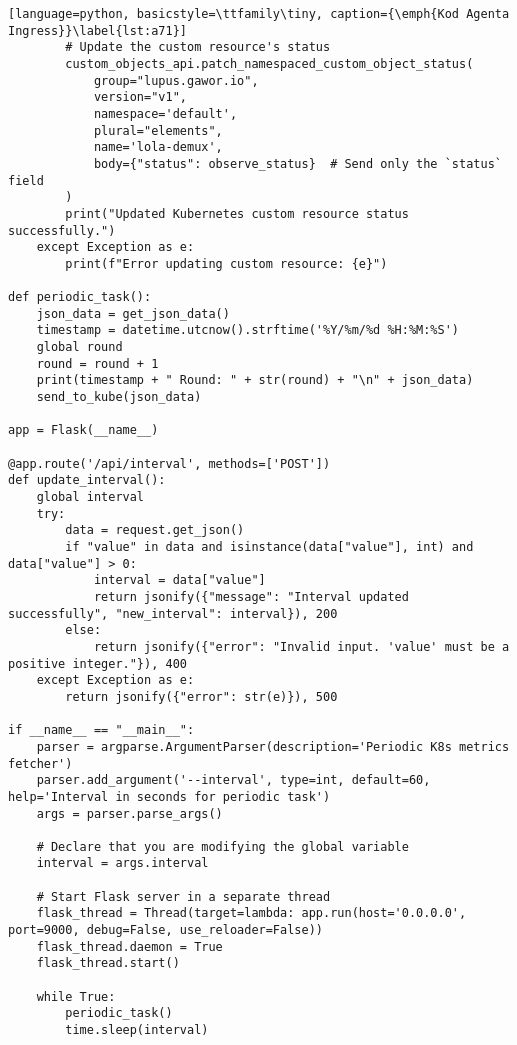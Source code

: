 \begin{lstlisting}[language=python, basicstyle=\ttfamily\tiny, caption={\emph{Kod Agenta Ingress}}\label{lst:a71}]
        # Update the custom resource's status
        custom_objects_api.patch_namespaced_custom_object_status(
            group="lupus.gawor.io",
            version="v1",
            namespace='default',
            plural="elements",
            name='lola-demux',
            body={"status": observe_status}  # Send only the `status` field
        )
        print("Updated Kubernetes custom resource status successfully.")
    except Exception as e:
        print(f"Error updating custom resource: {e}")

def periodic_task():
    json_data = get_json_data()
    timestamp = datetime.utcnow().strftime('%Y/%m/%d %H:%M:%S')
    global round 
    round = round + 1
    print(timestamp + " Round: " + str(round) + "\n" + json_data)
    send_to_kube(json_data)

app = Flask(__name__)

@app.route('/api/interval', methods=['POST'])
def update_interval():
    global interval
    try:
        data = request.get_json()
        if "value" in data and isinstance(data["value"], int) and data["value"] > 0:
            interval = data["value"]
            return jsonify({"message": "Interval updated successfully", "new_interval": interval}), 200
        else:
            return jsonify({"error": "Invalid input. 'value' must be a positive integer."}), 400
    except Exception as e:
        return jsonify({"error": str(e)}), 500

if __name__ == "__main__":
    parser = argparse.ArgumentParser(description='Periodic K8s metrics fetcher')
    parser.add_argument('--interval', type=int, default=60, help='Interval in seconds for periodic task')
    args = parser.parse_args()
    
    # Declare that you are modifying the global variable
    interval = args.interval

    # Start Flask server in a separate thread
    flask_thread = Thread(target=lambda: app.run(host='0.0.0.0', port=9000, debug=False, use_reloader=False))
    flask_thread.daemon = True
    flask_thread.start()
    
    while True:
        periodic_task()
        time.sleep(interval)
\end{lstlisting}